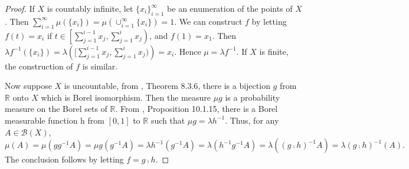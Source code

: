 \documentclass[11pt]{article}
\theoremstyle{plain}
\theoremstyle{definition}
\theoremstyle{remark}
\begin{document}
\begin{proof}
    If $X$ is countably infinite, let $\{x_i\}_{i=1}^{\infty}$ be an enumeration of the points of $X$.
    Then $\sum_{i=1}^{\infty} \mu(\{x_i\}) = \mu (\cup_{i=1}^\infty \{x_i\})=1$.
    We can construct $f$ by letting $f(t)=x_i$ if $t\in \left[\sum_{j=1}^{i-1}x_j, \sum_{j=1}^{i}x_j\right)$, and $f(1)=x_1$.
    Then $\lambda f^{-1}( \{x_i\})=\lambda\left([\sum_{j=1}^{i-1}x_j, \sum_{j=1}^{i}x_j)\right)= x_i$.
    Hence $\mu = \lambda f^{-1}$.
    If $X$ is finite, the construction of $f$ is similar.

    Now suppose $X$ is uncountable, from \cite{book:992991}, Theorem 8.3.6, there is a bijection $g$ from $\mathbb R$ onto $X$ which is Borel isomorphism.
    Then the measure $\mu g$ is a probability measure on the Borel sets of $\mathbb R$.
    From \cite{book:992991}, Proposition 10.1.15, there is a Borel measurable function h from $[0,1]$ to $\mathbb R$ such that $\mu g = \lambda h^{-1}$.
    Thus, for any $A\in \mathcal B (X)$,
    \begin{equation*}
        \mu(A) = \mu ( g g^{-1} A) = \mu g(g^{-1} A)= \lambda h^{-1}(g^{-1}A)
        =\lambda (h^{-1} g^{-1} A)
        =\lambda ( (g\comp h)^{-1} A)
        =\lambda (g\comp h)^{-1} (  A).
    \end{equation*}
The conclusion follows by letting $f= g\comp h$.
\end{proof}
\end{document}
